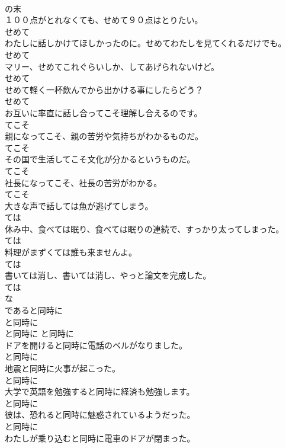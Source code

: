 \documentclass[8pt]{extreport}
\begin{document}
\begin{CJK}{UTF8}{min}
\\	の末	
\\	１００点がとれなくても、せめて９０点はとりたい。	
\\	せめて	
\\	わたしに話しかけてほしかったのに。せめてわたしを見てくれるだけでも。	
\\	せめて	
\\	マリー、せめてこれぐらいしか、してあげられないけど。	
\\	せめて	
\\	せめて軽く一杯飲んでから出かける事にしたらどう？	
\\	せめて	
\\	お互いに率直に話し合ってこそ理解し合えるのです。	
\\	てこそ	
\\	親になってこそ、親の苦労や気持ちがわかるものだ。	
\\	てこそ	
\\	その国で生活してこそ文化が分かるというものだ。	
\\	てこそ	
\\	社長になってこそ、社長の苦労がわかる。	
\\	てこそ	
\\	大きな声で話しては魚が逃げてしまう。	
\\	ては	
\\	休み中、食べては眠り、食べては眠りの連続で、すっかり太ってしまった。	
\\	ては	
\\	料理がまずくては誰も来ませんよ。	
\\	ては	
\\	書いては消し、書いては消し、やっと論文を完成した。	
\\	ては	
\\	な
\\	であると同時に	
\\	と同時に	
\\	と同時に	と同時に	
\\	ドアを開けると同時に電話のベルがなりました。	
\\	と同時に	
\\	地震と同時に火事が起こった。	
\\	と同時に	
\\	大学で英語を勉強すると同時に経済も勉強します。	
\\	と同時に	
\\	彼は、恐れると同時に魅惑されているようだった。	
\\	と同時に	
\\	わたしが乗り込むと同時に電車のドアが閉まった。	

\end{CJK}
\end{document}
